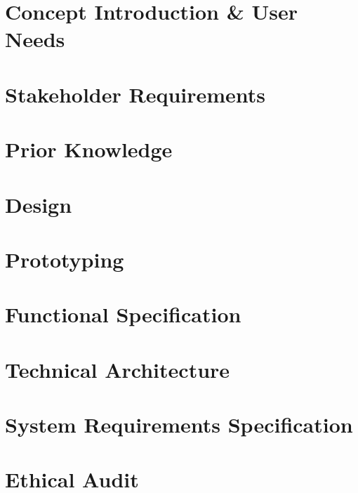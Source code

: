 \documentclass[12pt]{report}
\newcommand\blankpage{%
    \null
    \thispagestyle{empty}%
    \addtocounter{page}{-1}%
    \newpage}
\begin{document}
\afterpage{\blankpage}


\chapter{Concept Introduction \& User Needs}



\chapter{Stakeholder Requirements}



\chapter{Prior Knowledge}



\chapter{Design}



\chapter{Prototyping}



\chapter{Functional Specification}



\chapter{Technical Architecture}



\chapter{System Requirements Specification}



\chapter{Ethical Audit}

\end{document}
